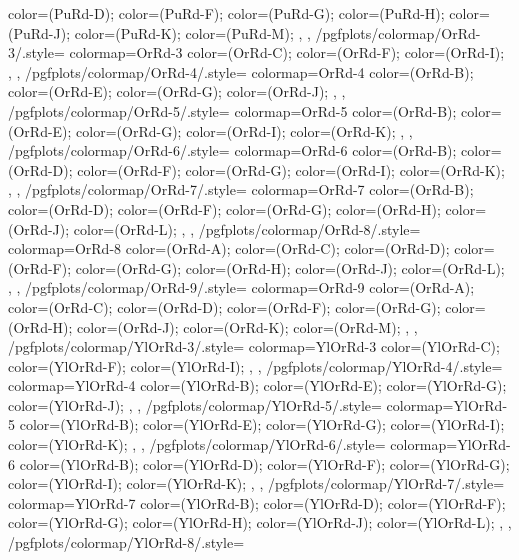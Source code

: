 {{{      color=(PuRd-D);
      color=(PuRd-F);
      color=(PuRd-G);
      color=(PuRd-H);
      color=(PuRd-J);
      color=(PuRd-K);
      color=(PuRd-M);
    },
  },
  /pgfplots/colormap/OrRd-3/.style={
    colormap={OrRd-3}{
      color=(OrRd-C);
      color=(OrRd-F);
      color=(OrRd-I);
    },
  },
  /pgfplots/colormap/OrRd-4/.style={
    colormap={OrRd-4}{
      color=(OrRd-B);
      color=(OrRd-E);
      color=(OrRd-G);
      color=(OrRd-J);
    },
  },
  /pgfplots/colormap/OrRd-5/.style={
    colormap={OrRd-5}{
      color=(OrRd-B);
      color=(OrRd-E);
      color=(OrRd-G);
      color=(OrRd-I);
      color=(OrRd-K);
    },
  },
  /pgfplots/colormap/OrRd-6/.style={
    colormap={OrRd-6}{
      color=(OrRd-B);
      color=(OrRd-D);
      color=(OrRd-F);
      color=(OrRd-G);
      color=(OrRd-I);
      color=(OrRd-K);
    },
  },
  /pgfplots/colormap/OrRd-7/.style={
    colormap={OrRd-7}{
      color=(OrRd-B);
      color=(OrRd-D);
      color=(OrRd-F);
      color=(OrRd-G);
      color=(OrRd-H);
      color=(OrRd-J);
      color=(OrRd-L);
    },
  },
  /pgfplots/colormap/OrRd-8/.style={
    colormap={OrRd-8}{
      color=(OrRd-A);
      color=(OrRd-C);
      color=(OrRd-D);
      color=(OrRd-F);
      color=(OrRd-G);
      color=(OrRd-H);
      color=(OrRd-J);
      color=(OrRd-L);
    },
  },
  /pgfplots/colormap/OrRd-9/.style={
    colormap={OrRd-9}{
      color=(OrRd-A);
      color=(OrRd-C);
      color=(OrRd-D);
      color=(OrRd-F);
      color=(OrRd-G);
      color=(OrRd-H);
      color=(OrRd-J);
      color=(OrRd-K);
      color=(OrRd-M);
    },
  },
  /pgfplots/colormap/YlOrRd-3/.style={
    colormap={YlOrRd-3}{
      color=(YlOrRd-C);
      color=(YlOrRd-F);
      color=(YlOrRd-I);
    },
  },
  /pgfplots/colormap/YlOrRd-4/.style={
    colormap={YlOrRd-4}{
      color=(YlOrRd-B);
      color=(YlOrRd-E);
      color=(YlOrRd-G);
      color=(YlOrRd-J);
    },
  },
  /pgfplots/colormap/YlOrRd-5/.style={
    colormap={YlOrRd-5}{
      color=(YlOrRd-B);
      color=(YlOrRd-E);
      color=(YlOrRd-G);
      color=(YlOrRd-I);
      color=(YlOrRd-K);
    },
  },
  /pgfplots/colormap/YlOrRd-6/.style={
    colormap={YlOrRd-6}{
      color=(YlOrRd-B);
      color=(YlOrRd-D);
      color=(YlOrRd-F);
      color=(YlOrRd-G);
      color=(YlOrRd-I);
      color=(YlOrRd-K);
    },
  },
  /pgfplots/colormap/YlOrRd-7/.style={
    colormap={YlOrRd-7}{
      color=(YlOrRd-B);
      color=(YlOrRd-D);
      color=(YlOrRd-F);
      color=(YlOrRd-G);
      color=(YlOrRd-H);
      color=(YlOrRd-J);
      color=(YlOrRd-L);
    },
  },
  /pgfplots/colormap/YlOrRd-8/.style={
}}
